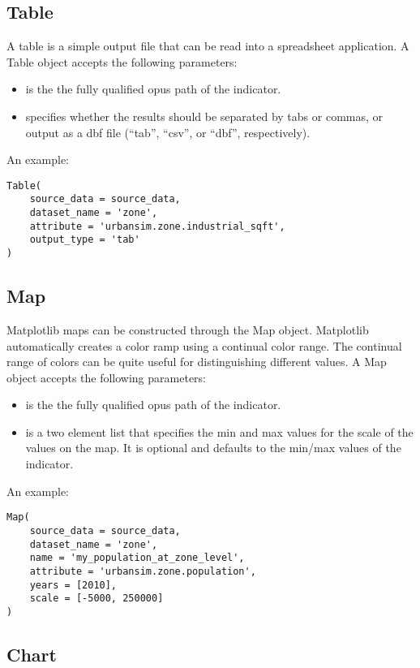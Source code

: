\subsection{Table}
A table is a simple output file that can be read into a spreadsheet application. 
A Table object accepts the following parameters:

\begin{itemize}
\tight
\item {} is the the fully qualified opus path of the indicator. 
\item {} specifies whether the results should be separated 
by tabs or commas, or output as a dbf file (``tab'', ``csv'', or ``dbf'', respectively).
\end{itemize}

An example:
\begin{verbatim}
Table(
    source_data = source_data,
    dataset_name = 'zone',
    attribute = 'urbansim.zone.industrial_sqft',
    output_type = 'tab'
) 
\end{verbatim}

\subsection{Map}

Matplotlib maps can be constructed through the Map object. 
Matplotlib automatically creates a color
ramp using a continual color range.  The continual range of colors can be
quite useful for distinguishing different values. 
A Map object accepts the following parameters:

\begin{itemize}
\tight
\item {} is the the fully qualified opus path of the indicator. 
\item {} is a two element list that specifies the min and max values 
for the scale of the values on the map. It is optional and defaults to the
min/max values of the indicator. 
\end{itemize}
  
An example:
\begin{verbatim}
Map( 
    source_data = source_data,
    dataset_name = 'zone',
    name = 'my_population_at_zone_level',
    attribute = 'urbansim.zone.population',
    years = [2010], 
    scale = [-5000, 250000]
)
\end{verbatim}

\subsection{Chart}

